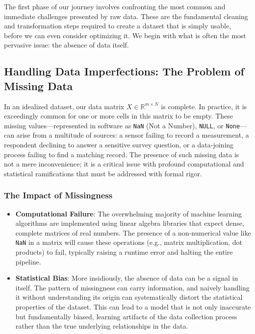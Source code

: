 The first phase of our journey involves confronting the most common and immediate challenges presented by raw data. These are the fundamental cleaning and transformation steps required to create a dataset that is simply usable, before we can even consider optimizing it. We begin with what is often the most pervasive issue: the absence of data itself.

\subsection{Handling Data Imperfections: The Problem of Missing Data}
\label{subsec:missing_data}
In an idealized dataset, our data matrix $X \in \mathbb{R}^{m \times N}$ is complete. In practice, it is exceedingly common for one or more cells in this matrix to be empty. These missing values—represented in software as \texttt{NaN} (Not a Number), \texttt{NULL}, or \texttt{None}—can arise from a multitude of sources: a sensor failing to record a measurement, a respondent declining to answer a sensitive survey question, or a data-joining process failing to find a matching record. The presence of such missing data is not a mere inconvenience; it is a critical issue with profound computational and statistical ramifications that must be addressed with formal rigor.

\subsubsection{The Impact of Missingness}
\begin{itemize}
    \item \textbf{Computational Failure}: The overwhelming majority of machine learning algorithms are implemented using linear algebra libraries that expect dense, complete matrices of real numbers. The presence of a non-numerical value like \texttt{NaN} in a matrix will cause these operations (e.g., matrix multiplication, dot products) to fail, typically raising a runtime error and halting the entire pipeline.
    \item \textbf{Statistical Bias}: More insidiously, the absence of data can be a signal in itself. The pattern of missingness can carry information, and naively handling it without understanding its origin can systematically distort the statistical properties of the dataset. This can lead to a model that is not only inaccurate but fundamentally biased, learning artifacts of the data collection process rather than the true underlying relationships in the data.
\end{itemize}

